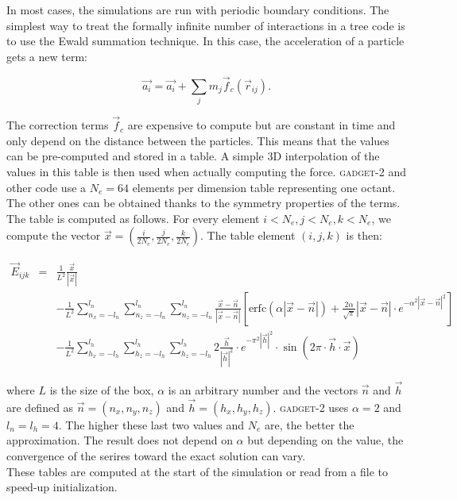\documentclass[a4paper,10pt]{report}
\newcommand{\gadget}{\textsc{gadget-2 }}
\begin{document}
In most cases, the simulations are run with periodic boundary conditions. The simplest way to treat the formally
infinite number of interactions in a tree code is to use the Ewald summation technique. In this case, the acceleration
of a particle gets a new term:

\begin{equation}
 \vec{a_i} = \vec{a_i} + \sum_j m_j \vec{f}_c(\vec{r}_{ij}).
\end{equation}

The correction terms $\vec{f}_c$ are expensive to compute but are constant in time and only depend on the distance
between the particles. This means that the values can be pre-computed and stored in a table. A simple 3D interpolation
of the values in this table is then used when actually computing the force. \gadget and other code use a $N_e=64$
elements per dimension table representing one octant. The other ones can be obtained thanks to the symmetry properties
of the terms. \\

The table is computed as follows. For every element $i <N_e, j<N_e,k<N_e$, we compute the vector $\vec{x} =
(\frac{i}{2N_e}, \frac{j}{2N_e}, \frac{k}{2N_e})$. The table element $(i,j,k)$ is then:

\begin{eqnarray*}
 \vec{E}_{ijk} &=& \frac{1}{L^2}\frac{\vec{x}}{|\vec{x}|} \\
         & & -\frac{1}{L^2}\sum_{n_x=-l_n}^{l_n}\sum_{n_z=-l_n}^{l_n}\sum_{n_z=-l_n}^{l_n}
\frac{\vec{x}-\vec{n}}{|\vec{x}-\vec{n}|}\left[\mathrm{erfc}\left(\alpha|\vec{x}-\vec{n}|\right) +
\frac{2\alpha}{\sqrt{\pi}}|\vec{x}-\vec{n}|\cdot e^{-\alpha^2|\vec{x}-\vec{n}|^2}\right]\\
         & & -\frac{1}{L^2}\sum_{h_x=-l_h}^{l_h}\sum_{h_z=-l_h}^{l_h}\sum_{h_z=-l_h}^{l_h} 2\frac{\vec{h}}{|\vec{h}|^2}
\cdot e^{-\pi^2|\vec{h}|^2} \cdot \sin\left(2\pi\cdot \vec{h}\cdot\vec{x}\right)
\end{eqnarray*}

where $L$ is the size of the box, $\alpha$ is an arbitrary number and the vectors $\vec{n}$ and $\vec{h}$ are defined
as $\vec{n} = (n_x,n_y,n_z)$ and $\vec{h} = (h_x,h_y,h_z)$. \gadget uses $\alpha=2$ and $l_n=l_h=4$. The higher these
last two values and $N_e$ are, the better the approximation. The result does not depend on $\alpha$ but depending on
the value, the convergence of the serires toward the exact solution can vary. \\
These tables are computed at the start of the simulation or read from a file to speed-up initialization. \\
\end{document}
